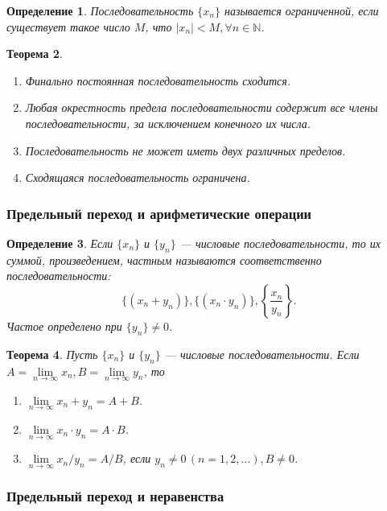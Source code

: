 \documentclass[12pt]{report}
\theoremstyle{plain}
\newtheorem{theorem}{Теорема}[chapter]
\newtheorem{definition}[theorem]{Определение}
\newcommand{\N}{\mathbb N}
\begin{document}
\begin{definition}
Последовательность $\{x_n\}$ называется ограниченной, если существует
такое число $M$, что $|x_n| < M, \forall n \in \N$.
\end{definition}

\begin{theorem}
  \begin{enumerate}
  \item Финально постоянная последовательность сходится.
    \item Любая окрестность предела последовательности содержит все члены последовательности,
    за исключением конечного их числа.
    \item Последовательность не может иметь двух различных пределов.
    \item Сходящаяся последовательность ограничена.
  \end{enumerate}
\end{theorem}

\subsubsection{Предельный переход и арифметические операции}

\begin{definition}
Если $\{x_n\}$ и $\{y_n\}$ --- числовые последовательности, то их суммой,
произведением, частным называются соответственно последовательности:
$$
\{(x_n + y_n)\}, \{(x_n \cdot y_n)\}, \left\{\dfrac{x_n}{y_n}\right\}.
$$
Частое определено при $\{y_n\} \ne 0$.
\end{definition}

\begin{theorem}
Пусть $\{x_n\}$ и $\{y_n\}$ --- числовые последовательности.
Если $A = \lim\limits_{n\rightarrow\infty} x_n, B = \lim\limits_{n\rightarrow\infty} y_n$, то
\begin{enumerate}
  \item $\lim\limits_{n\rightarrow\infty} x_n + y_n = A + B$.
  \item $\lim\limits_{n\rightarrow\infty} x_n \cdot y_n = A \cdot B$.
  \item $\lim\limits_{n\rightarrow\infty} x_n / y_n = A / B$, если $y_n \ne 0\, (n = 1, 2, \dots), B \ne 0$.
\end{enumerate}
\end{theorem}

\subsubsection{Предельный переход и неравенства}
\end{document}
